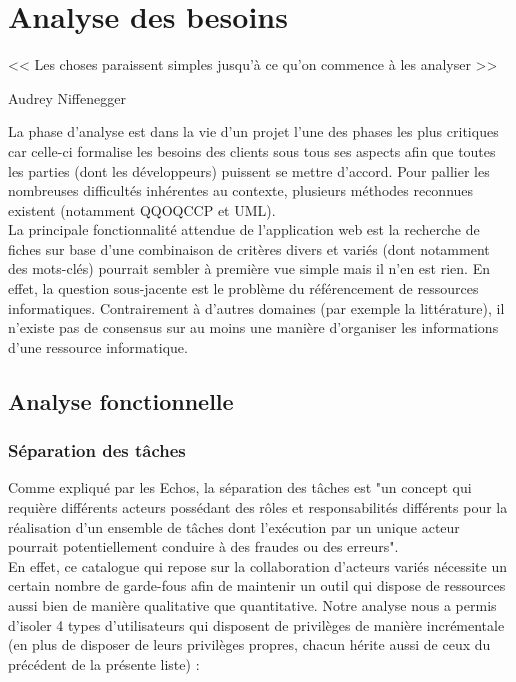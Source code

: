 
\chapter{Analyse des besoins}

\epigraph{<< Les choses paraissent simples jusqu'à ce qu'on commence à les analyser >>}{Audrey Niffenegger}

La phase d'analyse est dans la vie d'un projet l'une des phases les plus critiques car celle-ci formalise les besoins des clients sous tous ses aspects afin que toutes les parties (dont les développeurs) puissent se mettre d'accord. Pour pallier les nombreuses difficultés inhérentes au contexte, plusieurs méthodes reconnues existent (notamment \Gls{QQOQCCP} et UML). \\

La principale fonctionnalité attendue de l'application web est la recherche de fiches sur base d'une combinaison de critères divers et variés (dont notamment des mots-clés) pourrait sembler à première vue simple mais il n'en est rien. En effet, la question sous-jacente est le problème du référencement de ressources informatiques. Contrairement à d'autres domaines (par exemple la littérature), il n'existe pas de consensus sur au moins une manière d'organiser les informations d'une ressource informatique.

\section{Analyse fonctionnelle}

\subsection*{Séparation des tâches}

Comme expliqué par les Echos\cite{SOD}, la séparation des tâches est "un concept qui requière différents acteurs possédant des rôles et responsabilités différents pour la réalisation d’un ensemble de tâches dont l’exécution par un unique acteur pourrait potentiellement conduire à des fraudes ou des erreurs". \\


En effet, ce catalogue qui repose sur la collaboration d'acteurs variés nécessite un certain nombre de garde-fous afin de maintenir un outil qui dispose de ressources aussi bien de manière qualitative que quantitative. Notre analyse nous a permis d'isoler 4 types d'utilisateurs qui disposent de privilèges de manière incrémentale (en plus de disposer de leurs privilèges propres, chacun hérite aussi de ceux du précédent de la présente liste) :

